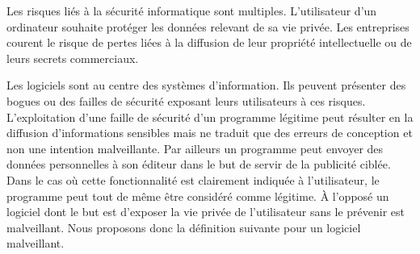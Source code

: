 Les risques liés à la sécurité informatique sont multiples.
L'utilisateur d'un ordinateur souhaite protéger les données relevant de sa vie privée.
Les entreprises courent le risque de pertes liées à la diffusion de leur propriété intellectuelle ou de leurs secrets commerciaux.

Les logiciels sont au centre des systèmes d'information. Ils peuvent présenter des bogues ou des failles de sécurité exposant leurs utilisateurs à ces risques.
L'exploitation d'une faille de sécurité d'un programme légitime peut résulter en la diffusion d'informations sensibles mais ne traduit que des erreurs de conception et non une intention malveillante.
Par ailleurs un programme peut envoyer des données personnelles à son éditeur dans le but de servir de la publicité ciblée. 
Dans le cas où cette fonctionnalité est clairement indiquée à l'utilisateur, le programme peut tout de même être considéré comme légitime.
À l'opposé un logiciel dont le but est d'exposer la vie privée de l'utilisateur sans le prévenir est malveillant.
Nous proposons donc la définition suivante pour un logiciel malveillant.
\\




